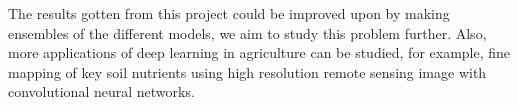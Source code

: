 \documentclass[12pt]{report}
\numberwithin{equation}{section}
\begin{document}
The results gotten from this project could be improved upon by making ensembles of the different models, we aim to study this problem further. Also, more applications of deep learning in agriculture can be studied, for example, fine mapping of key soil nutrients using high resolution remote sensing image with convolutional neural networks.
	



\newpage
{}
\renewcommand{\bibname}{\centering References}
 
 
 
 
 

%  
%  




\nocite{*}

\end{document}
